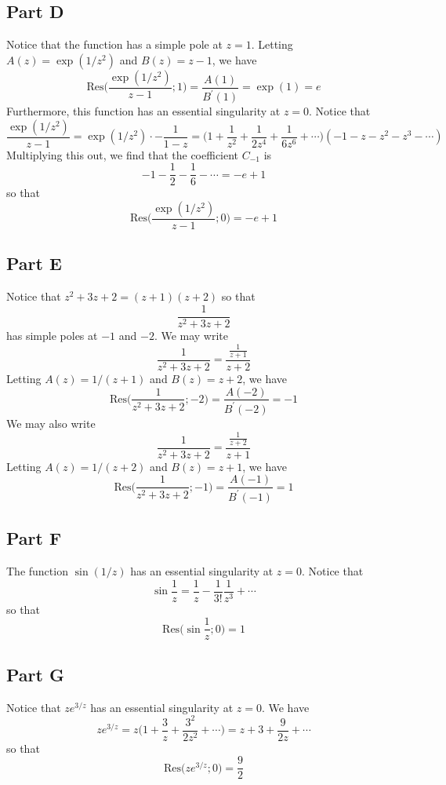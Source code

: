 \documentclass[12pt]{article}
\begin{document}
\subsection*{Part D}
Notice that the function has a simple pole at $z = 1$. Letting $A(z) = \exp(1/z^2)$ and $B(z) = z - 1$, we have
\[
\text{Res}\bigg(\frac{\exp(1/z^2)}{z-1}; 1\bigg) = \frac{A(1)}{B^\prime(1)} = \exp(1) = e
\] Furthermore, this function has an essential singularity at $z = 0$. Notice that
\[
\frac{\exp(1/z^2)}{z-1} = \exp(1/z^2) \cdot -\frac{1}{1-z} = \bigg(1 + \frac{1}{z^2} + \frac{1}{2z^4} + \frac{1}{6z^6}+\cdots\bigg)(-1-z-z^2-z^3 - \cdots)  
\] Multiplying this out, we find that the coefficient $C_{-1}$ is
\[
-1 - \frac{1}{2} - \frac{1}{6} - \cdots = -e + 1
\] so that
\[
\text{Res}\bigg(\frac{\exp(1/z^2)}{z-1}; 0\bigg) = -e + 1
\]
\subsection*{Part E}
Notice that $z^2 + 3z + 2 = (z+1)(z+2)$ so that
\[
\frac{1}{z^2 + 3z + 2}
\] has simple poles at $-1$ and $-2$. We may write
\[
\frac{1}{z^2 + 3z + 2} = \frac{\frac{1}{z+1}}{z+2}
\] Letting $A(z) = 1/(z+1)$ and $B(z) = z+2$, we have
\[
\text{Res}\bigg(\frac{1}{z^2 + 3z + 2}; -2\bigg) = \frac{A(-2)}{B^\prime(-2)} = -1
\] We may also write
\[
\frac{1}{z^2 + 3z + 2} = \frac{\frac{1}{z+2}}{z+1}
\] Letting $A(z) = 1/(z+2)$ and $B(z) = z+1$, we have
\[
\text{Res}\bigg(\frac{1}{z^2 + 3z + 2}; -1\bigg) = \frac{A(-1)}{B^\prime(-1)} = 1
\]
\subsection*{Part F}
The function $\sin(1/z)$ has an essential singularity at $z = 0 $. Notice that
\[
\sin \frac{1}{z} = \frac{1}{z} - \frac{1}{3!}\frac{1}{z^3} + \cdots
\] so that
\[
\text{Res}\bigg(\sin \frac{1}{z}; 0\bigg) = 1
\]
\subsection*{Part G}
Notice that $ze^{3/z}$ has an essential singularity at $z = 0$. We have
\[
z e^{3/z} = z\bigg(1 + \frac{3}{z} + \frac{3^2}{2z^2} + \cdots\bigg) = z + 3 + \frac{9}{2z} + \cdots
\] so that
\[
\text{Res}\bigg(z e^{3/z} ; 0\bigg) = \frac{9}{2}
\]
\end{document}
